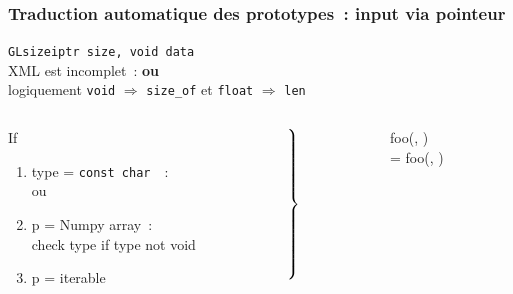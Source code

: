 \begin{frame}
  \frametitle{Traduction automatique des prototypes~: input via pointeur}
  \texttt{GLsizeiptr size,  void  data} \\[.5em]
  \attention{} \alert{XML est incomplet~:  \textbf{ou} } \\
  logiquement \texttt{void} $\Longrightarrow$ \texttt{size\_of} et \texttt{float} $\Longrightarrow$ \texttt{len} \\[1em]
  \begin{columns}
    \begin{column}[c]{.4\textwidth}
      If
      \begin{enumerate}
      \item type = \texttt{const char \ptr\ptr}~:\\
         ou 
      \item p = Numpy array~:\\
        check type if type not void \\
      \item p = iterable \\
      \end{enumerate}
    \end{column}
    \begin{column}[c]{1em}
      $\left.\rule{0pt}{2cm}\right\}$
    \end{column}
    \begin{column}[c]{.5\textwidth}
       foo(, ) \\
       = foo(, )
    \end{column}
  \end{columns}
  \note{
    \begin{enumerate}
    \item 
    \end{enumerate}
  }
\end{frame}

